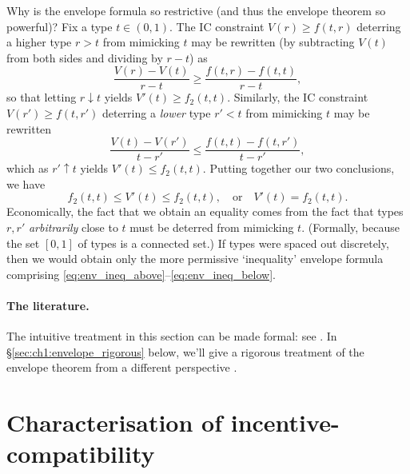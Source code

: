 \begin{remark}
	\label{remark:env_powerful}
	Why is the envelope formula so restrictive (and thus the envelope theorem so powerful)?
	Fix a type $t \in (0,1)$.
	The IC constraint $V(r) \geq f(t,r)$
	deterring a higher type $r>t$ from mimicking $t$
	may be rewritten (by subtracting $V(t)$ from both sides and dividing by $r-t$) as
	\begin{equation}
		\frac{V(r) - V(t)}{r-t} \geq \frac{f(t,r) - f(t,t)}{r-t} ,
		\label{eq:env_ineq_above}
	\end{equation}
	so that letting $r \downarrow t$ yields $V'(t) \geq f_2(t,t)$.
	Similarly, the IC constraint $V(r') \geq f(t,r')$
	deterring a \emph{lower} type $r'<t$ from mimicking $t$
	may be rewritten
	\begin{equation}
		\frac{V(t) - V(r')}{t-r'} \leq \frac{f(t,t) - f(t,r')}{t-r'} ,
		\label{eq:env_ineq_below}
	\end{equation}
	which as $r' \uparrow t$ yields $V'(t) \leq f_2(t,t)$.
	Putting together our two conclusions, we have
	\begin{equation*}
		f_2(t,t) \leq V'(t) \leq f_2(t,t) ,
		\quad \text{or} \quad
		V'(t) = f_2(t,t) .
	\end{equation*}
	Economically, the fact that we obtain an equality comes from the fact that types $r,r'$ \emph{arbitrarily} close to $t$ must be deterred from mimicking $t$. (Formally, because the set $[0,1]$ of types is a connected set.)
	If types were spaced out discretely, then we would obtain only the more permissive `inequality' envelope formula comprising \eqref{eq:env_ineq_above}--\eqref{eq:env_ineq_below}.
\end{remark}


\paragraph{The literature.}
The intuitive treatment in this section can be made formal: see \textcite{Sinander2022}.
In §\ref{sec:ch1:envelope_rigorous} below, we'll give a rigorous treatment of the envelope theorem from a different perspective \parencite{MilgromSegal2002}.



\section{Characterisation of incentive-compatibility}
\label{sec:ch1:ic}

